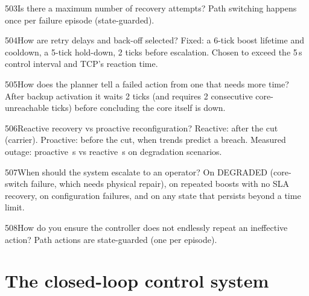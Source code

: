 \begin{qa}{503}{Is there a maximum number of recovery attempts?}
Path switching happens once per failure episode (state-guarded).
\end{qa}

\begin{qa}{504}{How are retry delays and back-off selected?}
Fixed: a 6-tick boost lifetime and cooldown, a 5-tick hold-down, 2 ticks before escalation. Chosen to exceed the
5\,s control interval and TCP's reaction time.
\end{qa}

\begin{qa}{505}{How does the planner tell a failed action from one that needs more time?}
After backup activation it waits 2 ticks (and requires 2 consecutive core-unreachable ticks) before concluding the
core itself is down.
\end{qa}

\begin{qa}{506}{Reactive recovery vs proactive reconfiguration?}
Reactive: after the cut (carrier). Proactive: before the cut, when trends predict a breach. Measured outage: proactive
\NOutDegFullMean\,s vs reactive \NOutDegReactiveMean\,s on degradation scenarios.
\end{qa}

\begin{qa}{507}{When should the system escalate to an operator?}
On \textsf{DEGRADED} (core-switch failure, which needs physical repair), on repeated boosts with no SLA recovery, on
configuration failures, and on any state that persists beyond a time limit.
\end{qa}

\begin{qa}{508}{How do you ensure the controller does not endlessly repeat an ineffective action?}
Path actions are state-guarded (one per episode).
\end{qa}

\FigResilience

\section{The closed-loop control system}

